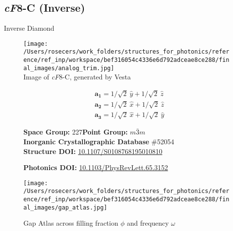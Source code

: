 \subsection{\large{\textit{cF}8-C (Inverse)}}\vspace{-0.1in}
Inverse Diamond


\begin{figure}[H]
\begin{minipage}{0.34\textwidth}\centering
\texttt{[image: /Users/rosecers/work\_folders/structures\_for\_photonics/reference/ref\_inp/workspace/bef316054c4336e6d792adceae8ce288/final\_images/analog\_trim.jpg]}\\
\small{Image of \textit{cF}8-C, generated by Vesta}
\end{minipage}\hfill
\begin{minipage}{0.65\textwidth}\raggedright
{\setlength{\mathindent}{0cm}
\begin{equation*}
\begin{split}&\boldsymbol{a_1} = 1/\sqrt{2}\ \hat{y} + 1/\sqrt{2}\ \hat{z}\\[-8pt]
&\boldsymbol{a_2} = 1/\sqrt{2}\ \hat{x} + 1/\sqrt{2}\ \hat{z}\\[-8pt]
&\boldsymbol{a_3} = 1/\sqrt{2}\ \hat{x} + 1/\sqrt{2}\ \hat{y}
\end{split}
\end{equation*}}

\textbf{Space Group:}	227\hspace{0.5in}\textbf{Point Group:}	$m\bar{3}m$\\
\textbf{Inorganic Crystallographic Database} \#52054\\
\textbf{Structure DOI: }\url{10.1107/S0108768195010810}

\textbf{Photonics DOI: }\url{10.1103/PhysRevLett.65.3152}
\end{minipage}\hfill
\end{figure}
\vspace{-0.25in}


\begin{figure}[H]
\begin{minipage}{0.9\textwidth}\centering
\texttt{[image: /Users/rosecers/work\_folders/structures\_for\_photonics/reference/ref\_inp/workspace/bef316054c4336e6d792adceae8ce288/final\_images/gap\_atlas.jpg]}
\\
\end{minipage}\hfill\caption{Gap Atlas across filling fraction $\phi$ and frequency $\omega$}
\end{figure}


